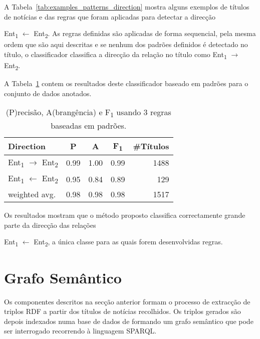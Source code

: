 \documentclass[a4paper, twocolumn, 11pt, twoside]{article}
\begin{document}
A Tabela~\ref{tab:examples_patterns_direction} mostra alguns exemplos de títulos de notícias e das regras que foram aplicadas para detectar a direcção {Ent\textsubscript{1} $\leftarrow$ Ent\textsubscript{2}. As regras definidas são aplicadas de forma sequencial, pela mesma ordem que são aqui descritas e se nenhum dos padrões definidos é detectado no título, o classificador classifica a direcção da relação no título como {Ent\textsubscript{1} $\rightarrow$ Ent\textsubscript{2}}.

A Tabela~\ref{tab:direction_clf_results} contem os resultados deste classificador baseado em padrões para o conjunto de dados anotados.

\begin{table}[!h]
    \begin{center}
    \begin{tabular}{l cccr}
        {\bf Direction} & {\bf P} & {\bf A} & {\bf F\textsubscript{1}} & {\bf \#Títulos} \\
        \hline
        \small{Ent\textsubscript{1} $\rightarrow$ Ent\textsubscript{2}} & 0.99  &  1.00  &  0.99  & 1488 \\
		\small{Ent\textsubscript{1} $\leftarrow$ Ent\textsubscript{2}}  & 0.95  &  0.84  &  0.89  & 129  \\
		\hline
	    weighted avg.     &      0.98       & 0.98       & 0.98		&   1517 \\
    \end{tabular}
	\caption{(P)recisão, A(brangência) e F\textsubscript{1} usando 3 regras baseadas em padrões.}
	\label{tab:direction_clf_results}
	\end{center}
\end{table}

Os resultados mostram que o método proposto classifica correctamente grande parte da direcção das relações {Ent\textsubscript{1} $\leftarrow$ Ent\textsubscript{2}, a única classe para as quais forem desenvolvidas regras.

\section{Grafo Semântico}
\label{sec:pipeline}

Os componentes descritos na secção anterior formam o processo de extracção de triplos RDF a partir dos títulos de notícias recolhidos. Os triplos gerados são depois indexados numa base de dados de formando um grafo semântico que pode ser interrogado recorrendo à linguagem SPARQL.

}}
\end{document}
